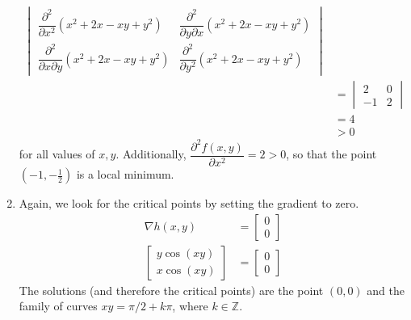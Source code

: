 \begin{enumerate}
\begin{align*}
\begin{vmatrix}
     \dfrac{\partial^2}{\partial x^2}(x^2 + 2x - xy + y^2) &
      \dfrac{\partial^2}{\partial y \partial x}(x^2 + 2x - xy + y^2) \\
     \dfrac{\partial^2}{\partial x \partial y}(x^2 + 2x - xy + y^2) &
      \dfrac{\partial^2}{\partial y^2}(x^2 + 2x - xy + y^2)
    \end{vmatrix} \\
    &= \begin{vmatrix} 2 & 0 \\ -1 & 2 \end{vmatrix} \\
    &= 4 \\
    &> 0
   \end{align*}
  for all values of $x,y$.
  Additionally, $\dfrac{\partial^2 f(x,y)}{\partial x^2} = 2 > 0$, so that
  the point $(-1, -\frac{1}{2})$ is a local minimum.

  \item Again, we look for the critical points by setting the gradient to zero.
   \begin{align*}
    \nabla h(x,y) &= \begin{bmatrix} 0 \\ 0 \end{bmatrix} \\
    \begin{bmatrix} y\cos(xy) \\ x\cos(xy) \end{bmatrix}
    &= \begin{bmatrix} 0 \\ 0 \end{bmatrix}
   \end{align*}
  The solutions (and therefore the critical points) are the point $(0, 0)$
  and the family of curves $xy = \pi/2 + k\pi$, where $k \in \mathbb{Z}$.


\end{enumerate}
